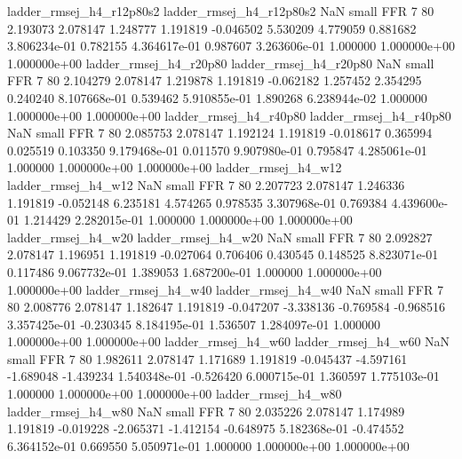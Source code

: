 ladder_rmsej_h4_r12p80s2 ladder_rmsej_h4_r12p80s2                   NaN      small      FFR                 7 80 2.193073       2.078147 1.248777       1.191819   -0.046502      5.530209      4.779059     0.881682   3.806234e-01  0.782155 4.364617e-01     0.987607   3.263606e-01            1.000000    1.000000e+00        1.000000e+00
  ladder_rmsej_h4_r20p80   ladder_rmsej_h4_r20p80                   NaN      small      FFR                 7 80 2.104279       2.078147 1.219878       1.191819   -0.062182      1.257452      2.354295     0.240240   8.107668e-01  0.539462 5.910855e-01     1.890268   6.238944e-02            1.000000    1.000000e+00        1.000000e+00
  ladder_rmsej_h4_r40p80   ladder_rmsej_h4_r40p80                   NaN      small      FFR                 7 80 2.085753       2.078147 1.192124       1.191819   -0.018617      0.365994      0.025519     0.103350   9.179468e-01  0.011570 9.907980e-01     0.795847   4.285061e-01            1.000000    1.000000e+00        1.000000e+00
     ladder_rmsej_h4_w12      ladder_rmsej_h4_w12                   NaN      small      FFR                 7 80 2.207723       2.078147 1.246336       1.191819   -0.052148      6.235181      4.574265     0.978535   3.307968e-01  0.769384 4.439600e-01     1.214429   2.282015e-01            1.000000    1.000000e+00        1.000000e+00
     ladder_rmsej_h4_w20      ladder_rmsej_h4_w20                   NaN      small      FFR                 7 80 2.092827       2.078147 1.196951       1.191819   -0.027064      0.706406      0.430545     0.148525   8.823071e-01  0.117486 9.067732e-01     1.389053   1.687200e-01            1.000000    1.000000e+00        1.000000e+00
     ladder_rmsej_h4_w40      ladder_rmsej_h4_w40                   NaN      small      FFR                 7 80 2.008776       2.078147 1.182647       1.191819   -0.047207     -3.338136     -0.769584    -0.968516   3.357425e-01 -0.230345 8.184195e-01     1.536507   1.284097e-01            1.000000    1.000000e+00        1.000000e+00
     ladder_rmsej_h4_w60      ladder_rmsej_h4_w60                   NaN      small      FFR                 7 80 1.982611       2.078147 1.171689       1.191819   -0.045437     -4.597161     -1.689048    -1.439234   1.540348e-01 -0.526420 6.000715e-01     1.360597   1.775103e-01            1.000000    1.000000e+00        1.000000e+00
     ladder_rmsej_h4_w80      ladder_rmsej_h4_w80                   NaN      small      FFR                 7 80 2.035226       2.078147 1.174989       1.191819   -0.019228     -2.065371     -1.412154    -0.648975   5.182368e-01 -0.474552 6.364152e-01     0.669550   5.050971e-01            1.000000    1.000000e+00        1.000000e+00
